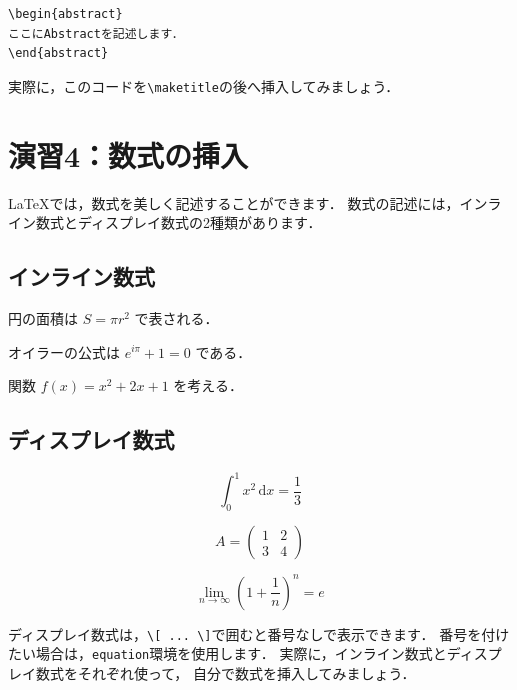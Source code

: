 \documentclass[a4paper,twocolumn]{jsarticle}
\newcommand{\dif}{\mathrm{d}}
\begin{document}
\begin{verbatim}
\begin{abstract}
ここにAbstractを記述します．
\end{abstract}
\end{verbatim}

実際に，このコードを\verb|\maketitle|の後へ挿入してみましょう．

\section*{演習4：数式の挿入}
LaTeXでは，数式を美しく記述することができます．
数式の記述には，インライン数式とディスプレイ数式の2種類があります．

\subsection*{インライン数式}
円の面積は $S=\pi r^2$ で表される．

オイラーの公式は $e^{i\pi}+1=0$ である．

関数 $f(x)=x^2+2x+1$ を考える．

\subsection*{ディスプレイ数式}
\begin{equation}
\int_{0}^{1} x^2\,\dif x=\frac{1}{3}
\label{eq:integral}
\end{equation}

\begin{equation}
A=
\begin{pmatrix}
1 & 2\\
3 & 4
\end{pmatrix}
\label{eq:matrix}
\end{equation}

\begin{equation}
\lim_{n\to\infty}
\left(1+\frac{1}{n}\right)^n=e
\label{eq:euler}
\end{equation}

ディスプレイ数式は，\verb|\[ ... \]|で囲むと番号なしで表示できます．
番号を付けたい場合は，\verb|equation|環境を使用します．
実際に，インライン数式とディスプレイ数式をそれぞれ使って，
自分で数式を挿入してみましょう．

\end{document}
